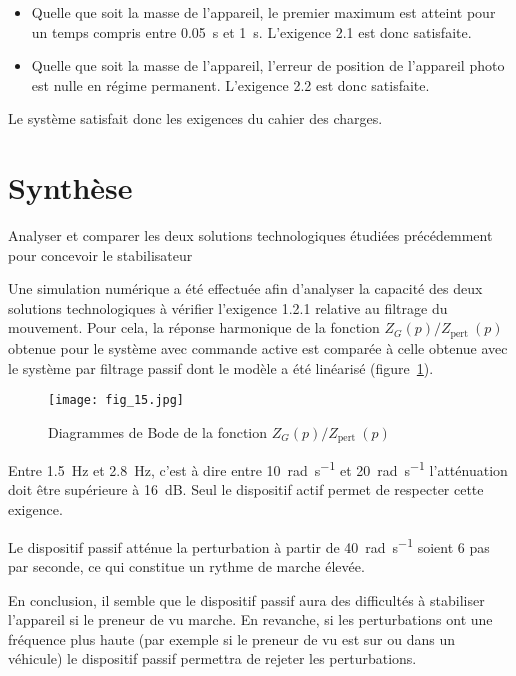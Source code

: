 \ifprof
\begin{corrige}
\begin{itemize}
\item Quelle que soit la masse de l'appareil, le premier maximum est atteint pour un temps compris entre \SI{0,05}{s} et \SI{1}{s}. L'exigence 2.1 est donc satisfaite. 
\item Quelle que soit la masse de l'appareil, l'erreur de position de l'appareil photo est nulle  en régime permanent. L'exigence 2.2 est donc satisfaite. 
\end{itemize}
Le système satisfait donc les exigences du cahier des charges. 

\end{corrige}
\else
\fi

\section{\label{part:5}Synthèse}
\begin{obj}
Analyser et comparer les deux solutions technologiques étudiées précédemment pour concevoir le stabilisateur
\end{obj}

\ifprof
\else

Une simulation numérique a été effectuée afin d'analyser la capacité des deux solutions technologiques à vérifier l'exigence 1.2.1 relative au filtrage du mouvement. Pour cela, la réponse harmonique de la fonction $Z_{G}(p) / Z_{\text {pert }}(p)$ obtenue pour le système avec commande active est comparée à celle obtenue avec le système par filtrage passif dont le modèle a été linéarisé (figure~\ref{fig:15}).

\begin{figure}[H]
\centering
\texttt{[image: fig\_15.jpg]}
\caption{\label{fig:15}  Diagrammes de Bode de la fonction $Z_{G}(p) / Z_{\text {pert }}(p)$}
\end{figure}
\fi


\ifprof
\begin{corrige}
Entre \SI{1,5}{Hz} et \SI{2,8}{Hz}, c'est à dire entre \SI{10}{rad.s^{-1}} et \SI{20}{rad.s^{-1}} l'atténuation doit être supérieure à \SI{16}{dB}. Seul le dispositif actif permet de respecter cette exigence. 


Le dispositif passif atténue la perturbation à partir de \SI{40}{rad.s^{-1}} soient 6 pas par seconde, ce qui constitue un rythme de marche élevée.

En conclusion, il semble que le dispositif passif aura des difficultés à stabiliser l'appareil si le preneur de vu marche. En revanche, si les perturbations ont une fréquence plus haute (par exemple si le preneur de vu est sur ou dans un véhicule) le dispositif passif permettra de rejeter les perturbations. 

\end{corrige}
\else
\fi

